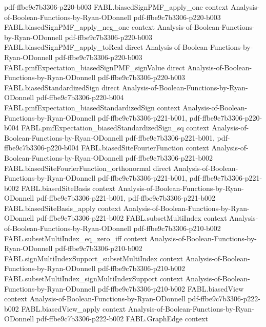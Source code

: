 \begin{theorem}
  {pdf-ffbe9c7b3306-p220-b003}
\proofstep
  {FABL.biasedSignPMF_apply_one}
  {context}
  {Analysis-of-Boolean-Functions-by-Ryan-ODonnell}
  {pdf-ffbe9c7b3306-p220-b003}
\proofstep
  {FABL.biasedSignPMF_apply_neg_one}
  {context}
  {Analysis-of-Boolean-Functions-by-Ryan-ODonnell}
  {pdf-ffbe9c7b3306-p220-b003}
\proofstep
  {FABL.biasedSignPMF_apply_toReal}
  {direct}
  {Analysis-of-Boolean-Functions-by-Ryan-ODonnell}
  {pdf-ffbe9c7b3306-p220-b003}
\proofstep
  {FABL.pmfExpectation_biasedSignPMF_signValue}
  {direct}
  {Analysis-of-Boolean-Functions-by-Ryan-ODonnell}
  {pdf-ffbe9c7b3306-p220-b003}
\proofstep
  {FABL.biasedStandardizedSign}
  {direct}
  {Analysis-of-Boolean-Functions-by-Ryan-ODonnell}
  {pdf-ffbe9c7b3306-p220-b004}
\proofstep
  {FABL.pmfExpectation_biasedStandardizedSign}
  {context}
  {Analysis-of-Boolean-Functions-by-Ryan-ODonnell}
  {pdf-ffbe9c7b3306-p221-b001,
    pdf-ffbe9c7b3306-p220-b004}
\proofstep
  {FABL.pmfExpectation_biasedStandardizedSign_sq}
  {context}
  {Analysis-of-Boolean-Functions-by-Ryan-ODonnell}
  {pdf-ffbe9c7b3306-p221-b001,
    pdf-ffbe9c7b3306-p220-b004}
\proofstep
  {FABL.biasedSiteFourierFunction}
  {context}
  {Analysis-of-Boolean-Functions-by-Ryan-ODonnell}
  {pdf-ffbe9c7b3306-p221-b002}
\proofstep
  {FABL.biasedSiteFourierFunction_orthonormal}
  {direct}
  {Analysis-of-Boolean-Functions-by-Ryan-ODonnell}
  {pdf-ffbe9c7b3306-p221-b001,
    pdf-ffbe9c7b3306-p221-b002}
\proofstep
  {FABL.biasedSiteBasis}
  {context}
  {Analysis-of-Boolean-Functions-by-Ryan-ODonnell}
  {pdf-ffbe9c7b3306-p221-b001,
    pdf-ffbe9c7b3306-p221-b002}
\proofstep
  {FABL.biasedSiteBasis_apply}
  {context}
  {Analysis-of-Boolean-Functions-by-Ryan-ODonnell}
  {pdf-ffbe9c7b3306-p221-b002}
\proofstep
  {FABL.subsetMultiIndex}
  {context}
  {Analysis-of-Boolean-Functions-by-Ryan-ODonnell}
  {pdf-ffbe9c7b3306-p210-b002}
\proofstep
  {FABL.subsetMultiIndex_eq_zero_iff}
  {context}
  {Analysis-of-Boolean-Functions-by-Ryan-ODonnell}
  {pdf-ffbe9c7b3306-p210-b002}
\proofstep
  {FABL.signMultiIndexSupport_subsetMultiIndex}
  {context}
  {Analysis-of-Boolean-Functions-by-Ryan-ODonnell}
  {pdf-ffbe9c7b3306-p210-b002}
\proofstep
  {FABL.subsetMultiIndex_signMultiIndexSupport}
  {context}
  {Analysis-of-Boolean-Functions-by-Ryan-ODonnell}
  {pdf-ffbe9c7b3306-p210-b002}
\proofstep
  {FABL.biasedView}
  {context}
  {Analysis-of-Boolean-Functions-by-Ryan-ODonnell}
  {pdf-ffbe9c7b3306-p222-b002}
\proofstep
  {FABL.biasedView_apply}
  {context}
  {Analysis-of-Boolean-Functions-by-Ryan-ODonnell}
  {pdf-ffbe9c7b3306-p222-b002}
\proofstep
  {FABL.GraphEdge}
  {context}

\end{theorem}
